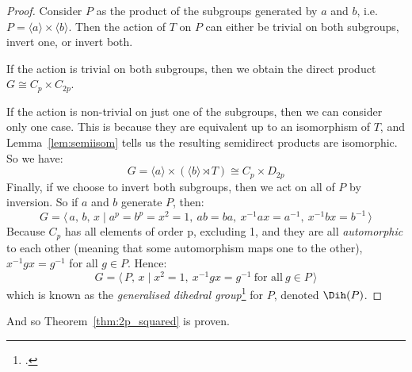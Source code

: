 \begin{proof}
        Consider \(P\) as the product of the subgroups generated by \(a\) and \(b\), i.e. \(P = \langle a \rangle \times
        \langle b \rangle\).
        Then the action of \(T\) on \(P\) can either be trivial on both subgroups, invert one, or invert both.

        If the action is trivial on both subgroups, then we obtain the direct product \(G \cong C_p \times C_{2p}\).

        If the action is non-trivial on just one of the subgroups, then we can consider only one case.
        This is because they are equivalent up to an isomorphism of \(T\), and Lemma~\ref{lem:semiisom} tells us the
        resulting semidirect products are isomorphic.
        So we have:
        \[G = \langle a \rangle \times (\langle b \rangle \rtimes T) \cong C_p \times D_{2p}\]
        Finally, if we choose to invert both subgroups, then we act on all of \(P\) by inversion.
        So if \(a\) and \(b\) generate \(P\), then:
        \[G = \langle\, a,\,b,\,x \mid a^p = b^p = x^2 = 1,\ ab = ba,\ x^{-1}ax = a^{-1},\ x^{-1}bx = b^{-1}\,\rangle\]
        Because \(C_p\) has all elements of order p, excluding 1, and they are all \emph{automorphic} to each other (meaning
        that some automorphism maps one to the other), \(x^{-1}gx = g^{-1}\) for all \(g \in P\).
        Hence:
        \[G = \langle\, P,\,x \mid x^2 = 1,\ x^{-1}gx = g^{-1}\ \text{for all}\ g \in P \,\rangle\]
        which is known as the \emph{generalised dihedral group}\footcite{gendihedral} for \(P\), denoted \(\Dih(P)\).
\end{proof}

And so Theorem~\ref{thm:2p_squared} is proven.

